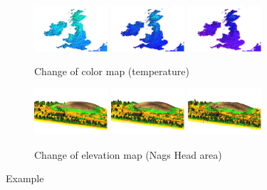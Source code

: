 \documentclass[a4paper,12pt]{book}
\begin{document}
\begin{figure}[ht]
\centering
    \begin{subfigure}[h]{\textwidth}
    \centering
    \includegraphics[width=0.3\textwidth]{./images/color_map1.png}
    \includegraphics[width=0.3\textwidth]{./images/color_map2.png}
    \includegraphics[width=0.3\textwidth]{./images/color_map3.png}
    \caption{Change of color map (temperature)}
    \label{fig:color_map}
    \end{subfigure}
    
    \begin{subfigure}[h]{\textwidth}
    \centering
    \includegraphics[width=0.3\textwidth]{./images/elevation_map1.png}
    \includegraphics[width=0.3\textwidth]{./images/elevation_map2.png}
    \includegraphics[width=0.3\textwidth]{./images/elevation_map3.png}
    \caption{Change of elevation map (Nags Head area)}
    \label{fig:elevation_map}
    \end{subfigure}
    \caption{Example}
    \label{fig:color_elevation_map}
\end{figure}
\end{document}
